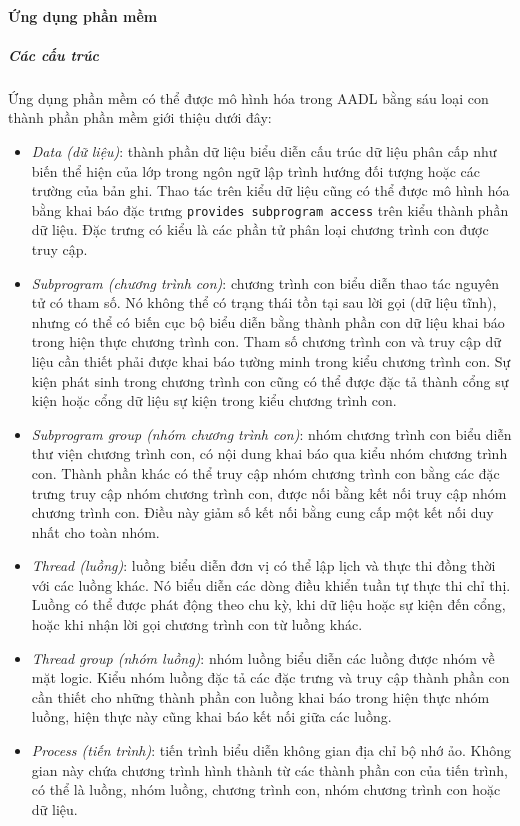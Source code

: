 \paragraph{Ứng dụng phần mềm}
\subparagraph{Các cấu trúc}
Ứng dụng phần mềm có thể được mô hình hóa trong AADL bằng sáu loại con thành phần phần mềm giới thiệu dưới đây:
\begin{itemize}
\item \emph{Data (dữ liệu)}: thành phần dữ liệu biểu diễn cấu trúc dữ liệu phân cấp như biến thể hiện của lớp trong ngôn ngữ lập trình hướng đối tượng hoặc các trường của bản ghi. Thao tác trên kiểu dữ liệu cũng có thể được mô hình hóa bằng khai báo đặc trưng \texttt{provides subprogram access} trên kiểu thành phần dữ liệu. Đặc trưng có kiểu là các phần tử phân loại chương trình con được truy cập.
\item \emph{Subprogram (chương trình con)}: chương trình con biểu diễn thao tác nguyên tử có tham số. Nó không thể có trạng thái tồn tại sau lời gọi (dữ liệu tĩnh), nhưng có thể có biến cục bộ biểu diễn bằng thành phần con dữ liệu khai báo trong hiện thực chương trình con. Tham số chương trình con và truy cập dữ liệu cần thiết phải được khai báo tường minh trong kiểu chương trình con. Sự kiện phát sinh trong chương trình con cũng có thể được đặc tả thành cổng sự kiện hoặc cổng dữ liệu sự kiện trong kiểu chương trình con.
\item \emph{Subprogram group (nhóm chương trình con)}: nhóm chương trình con biểu diễn thư viện chương trình con, có nội dung khai báo qua kiểu nhóm chương trình con. Thành phần khác có thể truy cập nhóm chương trình con bằng các đặc trưng truy cập nhóm chương trình con, được nối bằng kết nối truy cập nhóm chương trình con. Điều này giảm số kết nối bằng cung cấp một kết nối duy nhất cho toàn nhóm.
\item \emph{Thread (luồng)}: luồng biểu diễn đơn vị có thể lập lịch và thực thi đồng thời với các luồng khác. Nó biểu diễn các dòng điều khiển tuần tự thực thi chỉ thị. Luồng có thể được phát động theo chu kỳ, khi dữ liệu hoặc sự kiện đến cổng, hoặc khi nhận lời gọi chương trình con từ luồng khác.
\item \emph{Thread group (nhóm luồng)}: nhóm luồng biểu diễn các luồng được nhóm về mặt logic. Kiểu nhóm luồng đặc tả các đặc trưng và truy cập thành phần con cần thiết cho những thành phần con luồng khai báo trong hiện thực nhóm luồng, hiện thực này cũng khai báo kết nối giữa các luồng.
\item \emph{Process (tiến trình)}: tiến trình biểu diễn không gian địa chỉ bộ nhớ ảo. Không gian này chứa chương trình hình thành từ các thành phần con của tiến trình, có thể là luồng, nhóm luồng, chương trình con, nhóm chương trình con hoặc dữ liệu.
\end{itemize}

